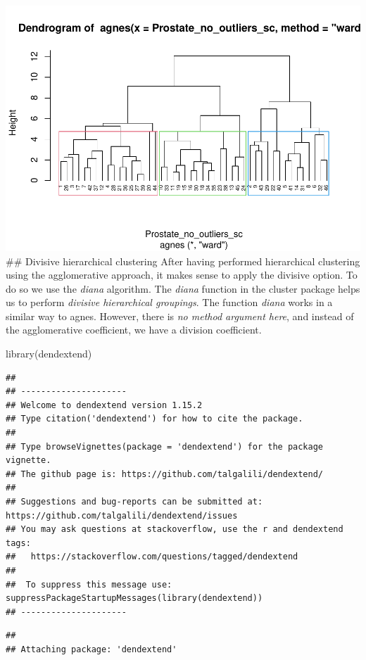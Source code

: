 \documentclass[
]{article}
\newenvironment{Shaded}{\begin{snugshade}}{\end{snugshade}}
\newcommand{\FunctionTok}[1]{\textcolor[rgb]{0.00,0.00,0.00}{#1}}
\newcommand{\NormalTok}[1]{#1}
\begin{document}
\includegraphics{clustering_files/figure-latex/unnamed-chunk-36-1.pdf}
\#\# Divisive hierarchical clustering After having performed
hierarchical clustering using the agglomerative approach, it makes sense
to apply the divisive option. To do so we use the \emph{diana}
algorithm. The \emph{diana} function in the cluster package helps us to
perform \emph{divisive hierarchical groupings}. The function
\emph{diana} works in a similar way to agnes. However, there is \emph{no
method argument here}, and instead of the agglomerative coefficient, we
have a division coefficient.

\begin{Shaded}
\begin{Highlighting}[]
\FunctionTok{library}\NormalTok{(dendextend)}
\end{Highlighting}
\end{Shaded}

\begin{verbatim}
## 
## ---------------------
## Welcome to dendextend version 1.15.2
## Type citation('dendextend') for how to cite the package.
## 
## Type browseVignettes(package = 'dendextend') for the package vignette.
## The github page is: https://github.com/talgalili/dendextend/
## 
## Suggestions and bug-reports can be submitted at: https://github.com/talgalili/dendextend/issues
## You may ask questions at stackoverflow, use the r and dendextend tags: 
##   https://stackoverflow.com/questions/tagged/dendextend
## 
##  To suppress this message use:  suppressPackageStartupMessages(library(dendextend))
## ---------------------
\end{verbatim}

\begin{verbatim}
## 
## Attaching package: 'dendextend'
\end{verbatim}
\end{document}
